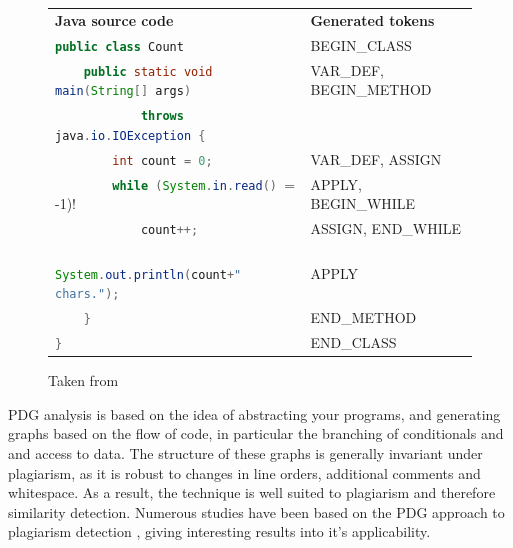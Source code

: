 \begin{figure}[H]
\begin{tabular}{l l}
\textbf{Java source code} & \textbf{Generated tokens} \\
\lstinline[language=Java]!public class Count! & BEGIN\_CLASS \\
\lstinline[language=Java]!    public static void main(String[] args)! & VAR\_DEF, BEGIN\_METHOD \\
\lstinline[language=Java]!            throws java.io.IOException {! \\
\lstinline[language=Java]!        int count = 0;! & VAR\_DEF, ASSIGN \\
\lstinline[language=Java]!        while (System.in.read() != -1)! & APPLY, BEGIN\_WHILE \\
\lstinline[language=Java]!            count++;! & ASSIGN, END\_WHILE \\
\lstinline[language=Java]!        System.out.println(count+" chars.");! & APPLY \\
\lstinline[language=Java]!    }! & END\_METHOD \\
\lstinline[language=Java]!}! & END\_CLASS \\
\end{tabular}
\caption{Taken from \citep[p.~1020]{JPlag}}
\end{figure}
\label{fig:JPlagTokenCreation}


PDG analysis is based on the idea of abstracting your programs, and generating
graphs based on the flow of code, in particular the branching of conditionals
and and access to data\cite{PDGOptimisation}. The structure of these graphs
is generally invariant under plagiarism, as it is robust to changes in line
orders, additional comments and whitespace\cite{GPLAG}. As a result, the technique is well
suited to plagiarism and therefore similarity detection. Numerous studies have been based
on the PDG approach to plagiarism detection\cite{GPLAG} \cite{OtherPDG}, giving
interesting results into it's applicability.

